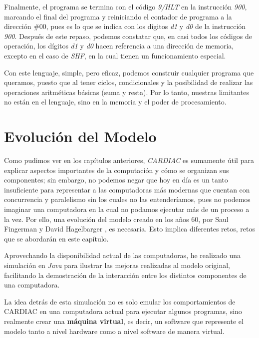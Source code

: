 \documentclass[letterpaper,12pt,oneside]{book}
\begin{document}
    Finalmente, el programa se termina con el código  \textit{9/HLT} en la instrucción \textit{900}, marcando el
	final del programa y reiniciando el contador de programa
	a la dirección \#00, pues es lo que se indica con los dígitos \textit{d1} y \textit{d0} de la instrucción \textit{900}. Después de este repaso, podemos constatar que, en casi todos los códigos de operación, los dígitos \textit{d1} y \textit{d0} hacen
	referencia a una dirección de memoria, excepto en el caso de \textit{SHF}, en la cual tienen un funcionamiento especial.
	
	Con este lenguaje, simple, pero eficaz, podemos construir cualquier programa que queramos,
	puesto que al tener ciclos, condicionales y la posibilidad de realizar
	las operaciones aritméticas básicas (suma y resta). Por lo tanto, nuestras limitantes no están en el lenguaje, sino en la memoria y el poder de 
	procesamiento.
	
	
	

	\clearpage	
	
\chapter{Evolución del Modelo}  %

	Como pudimos ver en los capítulos anteriores, \textit{CARDIAC} es sumamente útil para explicar aspectos importantes de la computación y cómo se organizan sus 	
	componentes; sin embargo, no podemos negar que hoy en día es un tanto insuficiente para representar a las computadoras más modernas que cuentan con
	concurrencia y paralelismo sin los cuales no las entenderíamos, pues no podemos imaginar una computadora en la cual no podamos 	
	ejecutar más de un proceso a la vez. Por ello, una evolución del modelo creado en los años 60, por Saul Fingerman y David Hagelbarger \cite{fingerman_instruction_1968},  es
	necesaria. Esto implica diferentes retos, retos que se abordarán en este capítulo.
	
	Aprovechando
	la disponibilidad actual de las computadoras, he realizado una simulación en \textit{Java} para ilustrar las mejoras realizadas al modelo
	original, facilitando la demostración de la interacción entre los distintos componentes de una computadora.
 
    La idea detrás de esta simulación
	no es solo emular los comportamientos de CARDIAC en una computadora actual para ejecutar algunos programas,
	sino realmente crear una \textbf{máquina virtual}, es decir, un software que represente
	el modelo tanto a nivel hardware como a nivel software de manera virtual.
 
\end{document}

